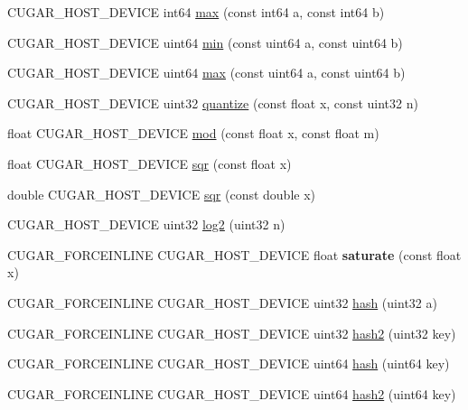 \begin{DoxyCompactItemize}
\item 
C\+U\+G\+A\+R\+\_\+\+H\+O\+S\+T\+\_\+\+D\+E\+V\+I\+CE int64 \hyperlink{group___basic_ga73436f2862d38a231bd77222838d5aed}{max} (const int64 a, const int64 b)
\item 
C\+U\+G\+A\+R\+\_\+\+H\+O\+S\+T\+\_\+\+D\+E\+V\+I\+CE uint64 \hyperlink{group___basic_ga91b60ae04cc513c797e708b451486a12}{min} (const uint64 a, const uint64 b)
\item 
C\+U\+G\+A\+R\+\_\+\+H\+O\+S\+T\+\_\+\+D\+E\+V\+I\+CE uint64 \hyperlink{group___basic_ga6e9a695197d693dac4c2561830268fdb}{max} (const uint64 a, const uint64 b)
\item 
C\+U\+G\+A\+R\+\_\+\+H\+O\+S\+T\+\_\+\+D\+E\+V\+I\+CE uint32 \hyperlink{group___basic_gaec0861071178aa411d87f2e6e808cfc6}{quantize} (const float x, const uint32 n)
\item 
float C\+U\+G\+A\+R\+\_\+\+H\+O\+S\+T\+\_\+\+D\+E\+V\+I\+CE \hyperlink{group___basic_gaa6ea8810d6e0f5f42d49be632566378c}{mod} (const float x, const float m)
\item 
float C\+U\+G\+A\+R\+\_\+\+H\+O\+S\+T\+\_\+\+D\+E\+V\+I\+CE \hyperlink{group___basic_gad7305249aeb2b830090e37dd335f0b6a}{sqr} (const float x)
\item 
double C\+U\+G\+A\+R\+\_\+\+H\+O\+S\+T\+\_\+\+D\+E\+V\+I\+CE \hyperlink{group___basic_gaa8137b4ffa803b854990ff46df30ef63}{sqr} (const double x)
\item 
C\+U\+G\+A\+R\+\_\+\+H\+O\+S\+T\+\_\+\+D\+E\+V\+I\+CE uint32 \hyperlink{group___basic_gacde218a6ddefd0151e099ff9dc2967f5}{log2} (uint32 n)
\item 
C\+U\+G\+A\+R\+\_\+\+F\+O\+R\+C\+E\+I\+N\+L\+I\+NE C\+U\+G\+A\+R\+\_\+\+H\+O\+S\+T\+\_\+\+D\+E\+V\+I\+CE float {\bfseries saturate} (const float x)
\item 
C\+U\+G\+A\+R\+\_\+\+F\+O\+R\+C\+E\+I\+N\+L\+I\+NE C\+U\+G\+A\+R\+\_\+\+H\+O\+S\+T\+\_\+\+D\+E\+V\+I\+CE uint32 \hyperlink{group___basic_ga4c88b92d7c3a2616868a11282da2be2f}{hash} (uint32 a)
\item 
C\+U\+G\+A\+R\+\_\+\+F\+O\+R\+C\+E\+I\+N\+L\+I\+NE C\+U\+G\+A\+R\+\_\+\+H\+O\+S\+T\+\_\+\+D\+E\+V\+I\+CE uint32 \hyperlink{group___basic_ga52957987430d0e47da74bf0f6dd7fe71}{hash2} (uint32 key)
\item 
C\+U\+G\+A\+R\+\_\+\+F\+O\+R\+C\+E\+I\+N\+L\+I\+NE C\+U\+G\+A\+R\+\_\+\+H\+O\+S\+T\+\_\+\+D\+E\+V\+I\+CE uint64 \hyperlink{group___basic_ga0dc531cb9c8f578fc90e08cbd390e4c2}{hash} (uint64 key)
\item 
C\+U\+G\+A\+R\+\_\+\+F\+O\+R\+C\+E\+I\+N\+L\+I\+NE C\+U\+G\+A\+R\+\_\+\+H\+O\+S\+T\+\_\+\+D\+E\+V\+I\+CE uint64 \hyperlink{group___basic_gaa6d53e12c691996cf8e9f853af40b83c}{hash2} (uint64 key)

\end{DoxyCompactItemize}
